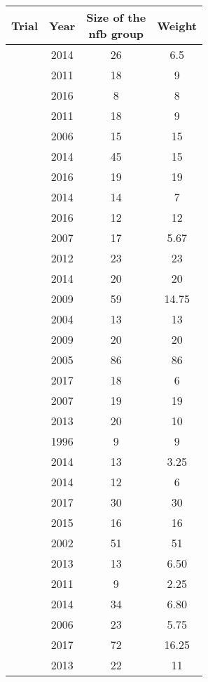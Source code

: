 \begin{tabular}{ cccc }
\toprule
Trial & Year & \shortstack{ Size of the \\ \gls{nfb} group } & Weight \\
\hline
\citeauthor{Arnold2014} & 2014 & 26 & 6.5\\ 
\citeauthor{Bakhshayesh2011} & 2011 & 18 & 9\\
\citeauthor{Baumeister2016} & 2016 & 8 & 8\\
\citeauthor{Bakhshayesh2011} & 2011 & 18 & 9\\
\citeauthor{Beauregard2006} & 2006 & 15 & 15\\
\citeauthor{Bink2014} & 2014 & 45 & 15\\
\citeauthor{Bluschke2016} & 2016 & 19 & 19\\
\citeauthor{Christiansen2014} & 2014 & 14 & 7\\
\citeauthor{Deilami2016} & 2016 & 12 & 12\\
\citeauthor{Drechsler2007} & 2007 & 17 & 5.67\\
\citeauthor{Duric2012} & 2012 & 23 & 23\\
\citeauthor{Escolano2014} & 2014 & 20 & 20\\
\citeauthor{Gevensleben2009} & 2009 & 59 & 14.75\\
\citeauthor{Heinrich2004} & 2004 & 13 & 13\\
\citeauthor{Holtmann2009} & 2009 & 20 & 20\\
\citeauthor{Kropotov2005} & 2005 & 86 & 86\\
\citeauthor{Lee2017} & 2017 & 18 & 6\\
\citeauthor{Leins2007} & 2007 & 19 & 19\\
\citeauthor{Li2013} & 2013 & 20 & 10\\
\citeauthor{Linden1996} & 1996 & 9 & 9\\
\citeauthor{Maurizio2014} & 2014 & 13 & 3.25\\
\citeauthor{Meisel2014} & 2014 & 12 & 6\\
\citeauthor{Mohagheghi2017} & 2017 & 30 & 30\\
\citeauthor{Mohammadi2015} & 2015 & 16 & 16\\
\citeauthor{Monastra2002} & 2002 & 51 & 51\\
\citeauthor{Ogrim2013} & 2013 & 13 & 6.50\\
\citeauthor{Steiner2011} & 2011 & 9 & 2.25\\
\citeauthor{Steiner2014} & 2014 & 34 & 6.80\\
\citeauthor{Strehl2006} & 2006 & 23 & 5.75\\
\citeauthor{Strehl2017} & 2017 & 72 & 16.25\\
\citeauthor{VanDongen2013} & 2013 & 22 & 11\\
\bottomrule
\end{tabular}

